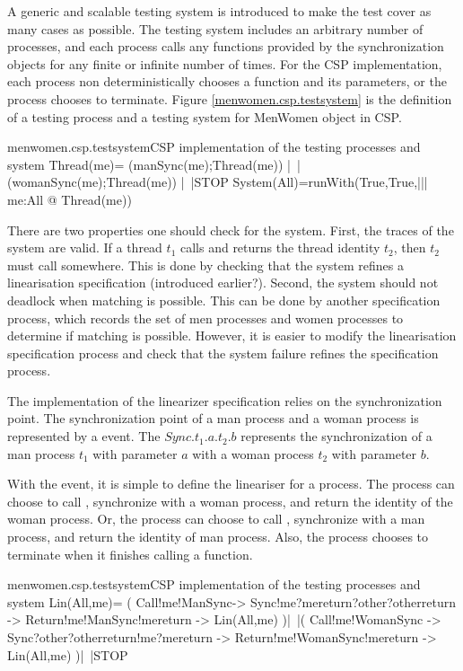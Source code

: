 \documentclass{article}
\begin{document}
A generic and scalable testing system is introduced to make the test cover as many cases as possible. The testing system includes an arbitrary number of processes, and each process calls any functions provided by the synchronization objects for any finite or infinite number of times. For the CSP implementation, each process non deterministically chooses a function and its parameters, or the process chooses to terminate. Figure \ref{menwomen.csp.testsystem} is the definition of a testing process and a testing system for MenWomen object in CSP.

\begin{cspinline}{menwomen.csp.testsystem}{CSP implementation of the testing processes and system}
Thread(me)=
    (manSync(me);Thread(me))
 |~|(womanSync(me);Thread(me))
 |~|STOP
System(All)=runWith(True,True,||| me:All @ Thread(me))
\end{cspinline}
  
There are two properties one should check for the system. First, the traces of the system are valid. If a thread $t_1$ calls  and returns the thread identity $t_2$, then $t_2$ must call  somewhere. This is done by checking that the system refines a linearisation specification (introduced earlier?). Second, the system should not deadlock when matching is possible. This can be done by another specification process, which records the set of men processes and women processes to determine if matching is possible. However, it is easier to modify the linearisation specification process and check that the system failure refines the specification process.

The implementation of the linearizer specification relies on the synchronization point. The synchronization point of a man process and a woman process is represented by a  event. The $Sync.t_1.a.t_2.b$ represents the synchronization of a man process $t_1$ with parameter $a$ with a woman process $t_2$ with parameter $b$.

With the  event, it is simple to define the lineariser for a process. The process can choose to call , synchronize with a woman process, and return the identity of the woman process. Or, the process can choose to call , synchronize with a man process, and return the identity of man process. Also, the process chooses to terminate when it finishes calling a function.
\begin{cspinline}{menwomen.csp.testsystem}{CSP implementation of the testing processes and system}
Lin(All,me)= (
  Call!me!ManSync->
  Sync!me?mereturn?other?otherreturn ->
  Return!me!ManSync!mereturn ->
  Lin(All,me)
)|~|(
  Call!me!WomanSync ->
  Sync?other?otherreturn!me?mereturn ->
  Return!me!WomanSync!mereturn ->
  Lin(All,me)
)|~|STOP
\end{cspinline}
\end{document}
